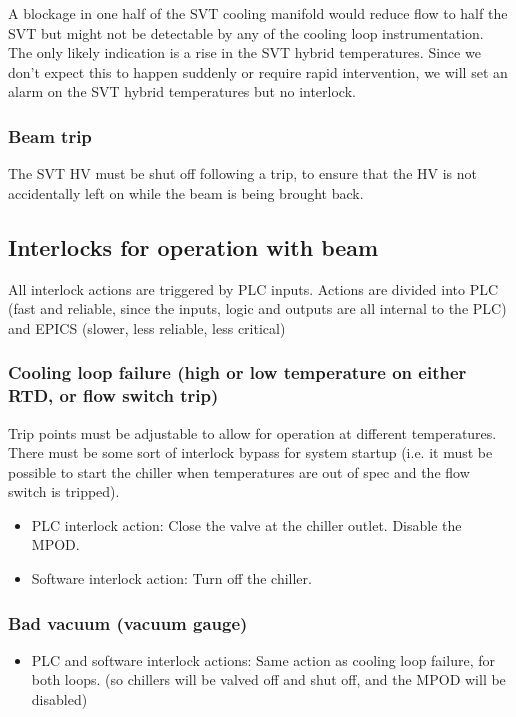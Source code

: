 \documentclass[12pt]{report}
\begin{document}
A blockage in one half of the SVT cooling manifold would reduce flow to half the SVT but might not be detectable by any of the cooling loop instrumentation. The only likely indication is a rise in the SVT hybrid temperatures. Since we don't expect this to happen suddenly or require rapid intervention, we will set an alarm on the SVT hybrid temperatures but no interlock.
\subsubsection*{Beam trip}
The SVT HV must be shut off following a trip, to ensure that the HV is not accidentally left on while the beam is being brought back.

\subsection{Interlocks for operation with beam}
All interlock actions are triggered by PLC inputs. Actions are divided into PLC (fast and reliable, since the inputs, logic and outputs are all internal to the PLC) and EPICS (slower, less reliable, less critical)
\subsubsection{Cooling loop failure (high or low temperature on either RTD, or flow switch trip)}
Trip points must be adjustable to allow for operation at different temperatures. There must be some sort of interlock bypass for system startup (i.e. it must be possible to start the chiller when temperatures are out of spec and the flow switch is tripped).
\begin{itemize}
    \item PLC interlock action: Close the valve at the chiller outlet. Disable the MPOD.
    \item Software interlock action: Turn off the chiller.
\end{itemize}

\subsubsection{Bad vacuum (vacuum gauge)}
\begin{itemize}
    \item PLC and software interlock actions: Same action as cooling loop failure, for both loops. (so chillers will be valved off and shut off, and the MPOD will be disabled)
\end{itemize}
\end{document}

